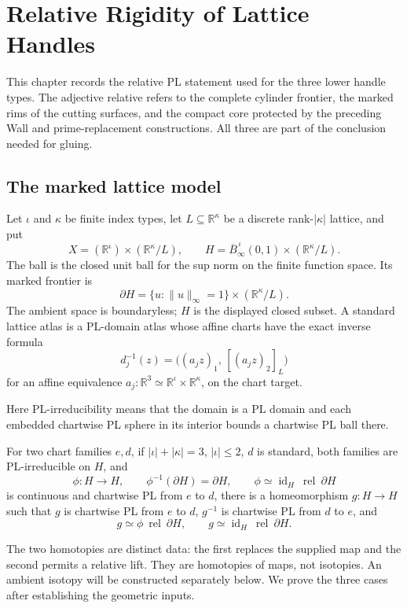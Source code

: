 \chapter{Relative Rigidity of Lattice Handles}
\label{ch:relative-rigidity}

This chapter records the relative PL statement used for the three lower handle
types.  The adjective relative refers to the complete cylinder frontier, the
marked rims of the cutting surfaces, and the compact core protected by the
preceding Wall and prime-replacement constructions.  All three are part of the
conclusion needed for gluing.

\section{The marked lattice model}
\label{sec:relative-rigidity-model}
\label{sec:relative-rigidity-contract}

Let $\iota$ and $\kappa$ be finite index types, let
$L\subseteq\mathbb R^\kappa$ be a discrete rank-$|\kappa|$ lattice, and put
\[
 X=(\mathbb R^\iota)\times(\mathbb R^\kappa/L),\qquad
 H=\overline B_{\infty}^{\,\iota}(0,1)\times(\mathbb R^\kappa/L).
\]
The ball is the closed unit ball for the sup norm on the finite function
space.  Its marked frontier is
\[
 \partial H=\{u: \|u\|_\infty=1\}\times(\mathbb R^\kappa/L).
\]
The ambient space is boundaryless; $H$ is the displayed closed subset.  A
standard lattice atlas is a PL-domain atlas whose affine charts have the exact
inverse formula
\[
 d_j^{-1}(z)=\bigl((a_jz)_1,\,[ (a_jz)_2 ]_L\bigr)
\]
for an affine equivalence $a_j:\mathbb R^3\simeq
\mathbb R^\iota\times\mathbb R^\kappa$, on the chart target.

Here PL-irreducibility means that the domain is a PL domain and each
embedded chartwise PL sphere in its interior bounds a chartwise PL ball
there.

\begin{theorem}
\label{def:marked-relative-torus-rigidity}
For two chart families $e,d$, if $|\iota|+|\kappa|=3$, $|\iota|\leq2$, $d$
is standard, both families are PL-irreducible on $H$, and
\[
 \phi:H\longrightarrow H,\qquad \phi^{-1}(\partial H)=\partial H,\qquad
 \phi\simeq\operatorname{id}_H\ \operatorname{rel}\ \partial H
\]
is continuous and chartwise PL from $e$ to $d$, there is a homeomorphism
$g:H\to H$ such that $g$ is chartwise PL from $e$ to $d$,
$g^{-1}$ is chartwise PL from $d$ to $e$, and
\[
 g\simeq\phi\ \operatorname{rel}\ \partial H,\qquad
 g\simeq\operatorname{id}_H\ \operatorname{rel}\ \partial H.
\]
\end{theorem}
The two homotopies are distinct data: the first replaces the supplied map and
the second permits a relative lift. They are homotopies of maps, not
isotopies. An ambient isotopy will be constructed separately below.
We prove the three cases after establishing the geometric inputs.

